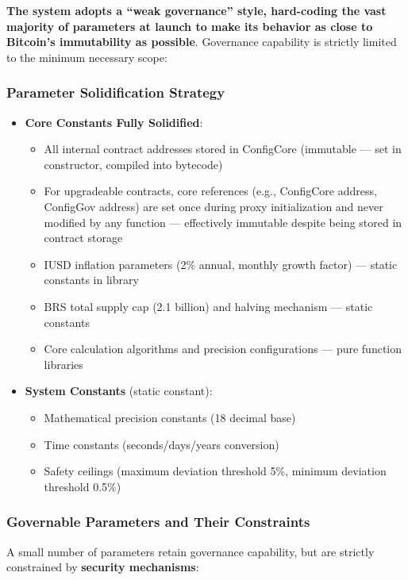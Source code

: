 \documentclass{article}
\begin{document}
\textbf{The system adopts a ``weak governance'' style, hard-coding the vast majority of parameters at launch to make its behavior as close to Bitcoin's immutability as possible}. Governance capability is strictly limited to the minimum necessary scope:

\subsubsection{Parameter Solidification Strategy}
\begin{itemize}
  \item \textbf{Core Constants Fully Solidified}:
    \begin{itemize}
      \item All internal contract addresses stored in ConfigCore (immutable --- set in constructor, compiled into bytecode)
      \item For upgradeable contracts, core references (e.g., ConfigCore address, ConfigGov address) are set once during proxy initialization and never modified by any function --- effectively immutable despite being stored in contract storage
      \item IUSD inflation parameters (2\% annual, monthly growth factor) --- static constants in library
      \item BRS total supply cap (2.1 billion) and halving mechanism --- static constants
      \item Core calculation algorithms and precision configurations --- pure function libraries
    \end{itemize}
  \item \textbf{System Constants} (static constant):
    \begin{itemize}
      \item Mathematical precision constants (18 decimal base)
      \item Time constants (seconds/days/years conversion)
      \item Safety ceilings (maximum deviation threshold 5\%, minimum deviation threshold 0.5\%)
    \end{itemize}
\end{itemize}

\subsubsection{Governable Parameters and Their Constraints}
A small number of parameters retain governance capability, but are strictly constrained by \textbf{security mechanisms}:
\end{document}
